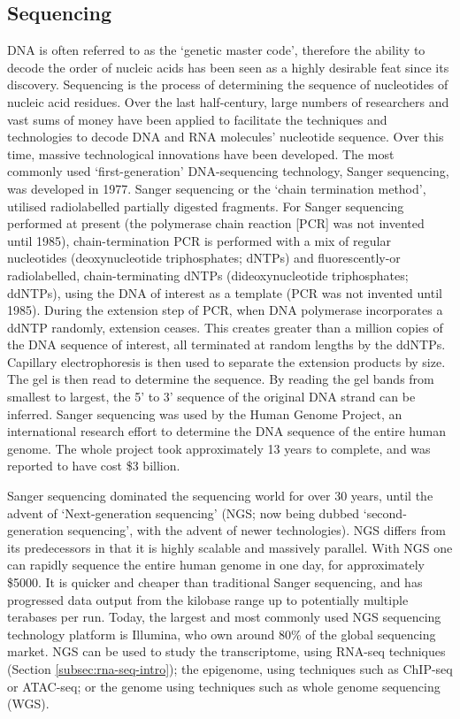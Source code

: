 \subsection{Sequencing}
DNA is often referred to as the `genetic master code', therefore the ability to decode the order of nucleic acids has been seen as a highly desirable feat since its discovery.
Sequencing is the process of determining the sequence of nucleotides of nucleic acid residues.
Over the last half-century, large numbers of researchers and vast sums of money have been applied to facilitate the techniques and technologies to decode DNA and RNA molecules' nucleotide sequence\cite{heather2016sequence}.
Over this time, massive technological innovations have been developed.
The most commonly used `first-generation' DNA-sequencing technology, Sanger sequencing, was developed in 1977\cite{sanger1977dna}.
Sanger sequencing or the `chain termination method', utilised radiolabelled partially digested fragments.
For Sanger sequencing performed at present (the polymerase chain reaction [PCR] was not invented until 1985), chain-termination PCR is performed with a mix of regular nucleotides (deoxynucleotide triphosphates; dNTPs) and fluorescently-or radiolabelled, chain-terminating dNTPs (dideoxynucleotide triphosphates; ddNTPs), using the DNA of interest as a template (PCR was not invented until 1985).
During the extension step of PCR, when DNA polymerase incorporates a ddNTP randomly, extension ceases.
This creates greater than a million copies of the DNA sequence of interest, all terminated at random lengths by the ddNTPs.
Capillary electrophoresis is then used to separate the extension products by size.
The gel is then read to determine the sequence.
By reading the gel bands from smallest to largest, the 5' to 3' sequence of the original DNA strand can be inferred.
Sanger sequencing was used by the Human Genome Project, an international research effort to determine the DNA sequence of the entire human genome\cite{pennisi2001human}.
The whole project took approximately 13 years to complete, and was reported to have cost \$3 billion.

Sanger sequencing dominated the sequencing world for over 30 years, until the advent of `Next-generation sequencing' (NGS; now being dubbed `second-generation sequencing', with the advent of newer technologies).
NGS differs from its predecessors in that it is highly scalable and massively parallel.
With NGS one can rapidly sequence the entire human genome in one day, for approximately \$5000.
It is quicker and cheaper than traditional Sanger sequencing, and has progressed data output from the kilobase range up to potentially multiple terabases per run.
Today, the largest and most commonly used NGS sequencing technology platform is Illumina, who own around 80\% of the global sequencing market.
NGS can be used to study the transcriptome, using RNA-seq techniques (Section \ref{subsec:rna-seq-intro}); the epigenome, using techniques such as ChIP-seq or ATAC-seq; or the genome using techniques such as whole genome sequencing (WGS).

